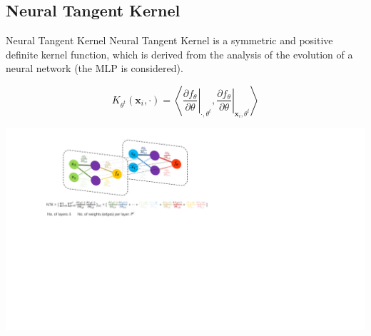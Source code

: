 \documentclass[aspectratio=169,xcolor=dvipsnames]{beamer}
\begin{document}
\subsection{Neural Tangent Kernel}
\begin{frame}{Neural Tangent Kernel}
\justify
Neural Tangent Kernel \cite{jacot2018neural,lee2019wide,bietti2019inductive,dou2021training} is a \alert{symmetric and positive definite kernel function}, which is derived from the analysis of the \alert{evolution of a neural network} (the MLP is considered).

\vspace{-1em}
\scriptsize{
\begin{equation}
    K_{\theta^t}(\bm{x}_i,\cdot)=\left\langle\left.\frac{\partial f_{\theta}}{\partial \theta}\right|_{\cdot,\theta^t},\left.\frac{\partial f_{\theta}}{\partial \theta}\right|_{\bm{x}_i,\theta^t} \right\rangle
\end{equation}
}


\centering
\includegraphics[width=0.7\linewidth]{Source/ntk_computation.pdf}
\end{frame}
\end{document}
